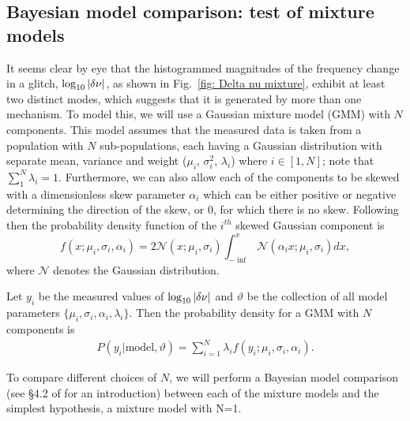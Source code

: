 \documentclass[../full_thesis/full_thesis.tex]{subfiles}
\begin{document}
\begin{subappendices}
\section{Bayesian model comparison: test of mixture models}
\label{sec: Bayesian model comparison}

It seems clear by eye that the histogrammed magnitudes of the frequency change
in a glitch, $\log_{10}|\delta\nu|$, as shown in Fig.~\ref{fig: Delta nu
mixture}, exhibit at least two distinct modes,
which suggests that it is generated by more than one
mechanism. To model this, we will use a Gaussian mixture model (GMM)
\citep{gelman2013bayesian} with $N$ components. This model assumes that the
measured data is taken from a population with $N$ sub-populations, each having
a Gaussian distribution with separate mean, variance and weight
($\mu_{i}$, $\sigma^{2}_{i}$, $\lambda_{i}$) where $i \in [1, N]$; note that $\sum_{1}^{N} \lambda_{i} = 1$.
Furthermore, we can also allow each of the components to be
skewed with a dimensionless skew parameter $\alpha_i$ which can be either
positive or negative determining the direction of the skew, or 0, for which
there is no skew. Following \citet{Ohagan1976} then
the probability density function of the $i^{th}$ skewed Gaussian component is
\begin{equation}
f(x; \mu_i, \sigma_i, \alpha_i)
= 2 \mathcal{N}(x; \mu_i, \sigma_i)
\int_{-\inf}^{x} \mathcal{N}(\alpha_i x; \mu_i, \sigma_i) dx,
\end{equation}
where $\mathcal{N}$ denotes the Gaussian distribution.

Let $y_{i}$ be the measured values of $\log_{10}|\delta\nu|$
and $\vartheta$ be the collection of all model parameters
$\{\mu_i, \sigma_i, \alpha_i, \lambda_i\}$.
Then the probability density for a GMM with $N$ components is
\begin{align}
P(y_i| \textrm{model}, \vartheta) =
 \sum_{i=1}^{N} \lambda_i f (y_i; \mu_i, \sigma_i, \alpha_i).
\end{align}

To compare different choices of $N$, we will perform a Bayesian model
comparison (see \S 4.2 of \citet{jaynes2003probability} for an introduction)
between each of the mixture models and the simplest hypothesis, a mixture model
with N=1.


\end{subappendices}
\end{document}
